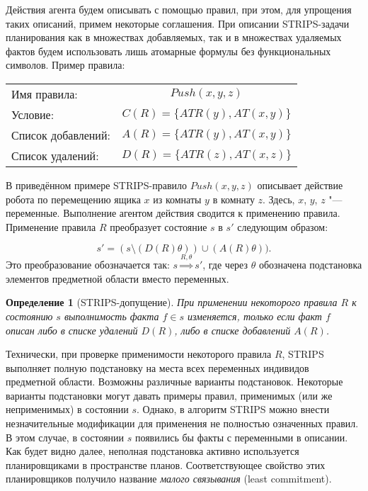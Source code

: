 \documentclass[b5paper,11pt]{book}
\newtheorem{Def}{Определение}
\numberwithin{Def}{section}
\numberwithin{Th}{chapter}
\numberwithin{St}{chapter}
\begin{document}
	Действия агента будем описывать с помощью правил, при этом, для упрощения таких описаний, примем некоторые соглашения. При описании STRIPS-задачи планирования как в множествах добавляемых, так и в множествах удаляемых фактов будем использовать  лишь атомарные формулы без функциональных символов. Пример правила:
	
	\begin{table}[H]
		\centering
		\begin{tabular}{l c}
			Имя правила: & $Push(x, y, z)$\\
			Условие: & $C(R) = \{ATR (y), AT(x, y)\}$\\
			Список добавлений: & $A(R) = \{ATR (y), AT(x, y)\}$\\
			Список удалений: & $D(R) = \{ATR (z), AT(x, z)\}$
		\end{tabular}
	\end{table}
	
	В приведённом примере STRIPS-правило $Push(x, y, z)$ описывает действие робота по перемещению ящика $x$ из комнаты $y$ в комнату $z$. Здесь, $x$, $y$, $z$ "--- переменные. Выполнение агентом действия сводится к применению правила. Применение правила $R$ преобразует состояние $s$ в $s'$ следующим образом:
	
	\[
		s' = (s \setminus (D(R)\theta)) \cup (A(R)\theta)).
	\]
	Это преобразование обозначается так: $s \overset{R,\theta}{\Rightarrow} s'$, где через $\theta$ обозначена подстановка элементов предметной области вместо переменных.
	
	\begin{Def}[STRIPS-допущение]
		При применении некоторого правила $R$ к состоянию $s$ выполнимость факта $f\in s$ изменяется, только если факт $f$ описан либо в списке удалений $D(R)$, либо в списке добавлений $A(R)$.
	\end{Def}
	
	Технически, при проверке применимости некоторого правила $R$, STRIPS выполняет полную подстановку на места всех переменных индивидов предметной области. Возможны различные варианты подстановок. Некоторые варианты подстановки могут давать примеры правил, применимых (или же неприменимых) в состоянии $s$. Однако, в алгоритм STRIPS можно внести незначительные модификации для применения не полностью означенных правил. В этом случае, в состоянии $s$ появились бы факты с переменными в описании. Как будет видно далее, неполная подстановка активно используется планировщиками в пространстве планов. Соответствующее свойство этих планировщиков получило название \textit{малого связывания} (least commitment).
	
\end{document}
